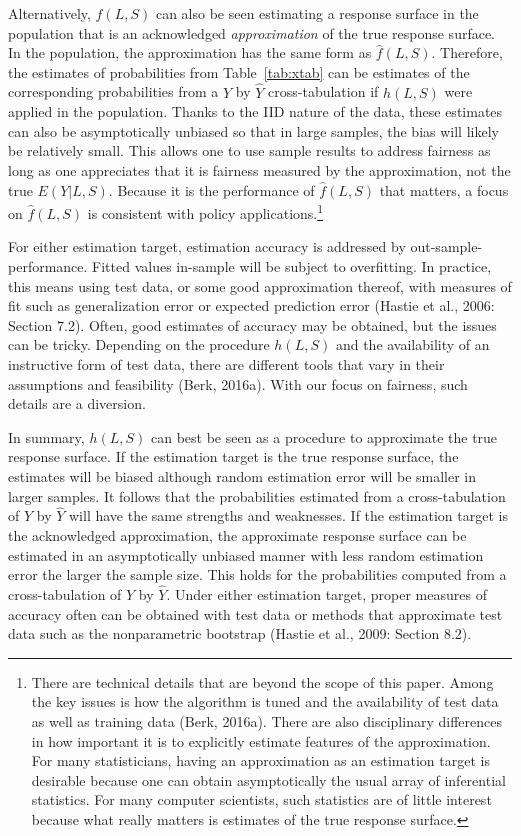 \documentclass[12pt]{article}
\begin{document}
Alternatively, $\hat{f}(L,S)$ can also be seen estimating a response surface in the population that is an acknowledged \textit{approximation} of the true response surface. In the population, the approximation has the same form as $\hat{f}(L,S)$. Therefore, the estimates of probabilities from Table~\ref{tab:xtab} can be estimates of the corresponding probabilities from a $Y$ by $\hat{Y}$ cross-tabulation if $h(L,S)$ were applied in the population. Thanks to the IID nature of the data, these estimates can also be asymptotically unbiased so that in large samples, the bias will likely be relatively small. This allows one to use sample results to address fairness as long as one appreciates that it is fairness measured by the approximation, not the true $E(Y|L,S)$. Because it is the performance of $\hat{f}(L,S)$ that matters, a focus on $\hat{f}(L,S)$ is consistent with policy applications.\footnote
{
There are technical details that are beyond the scope of this paper. Among the key issues is how the algorithm is tuned and the availability of test data as well as training data (Berk, 2016a). There are also disciplinary differences in how important it is to explicitly estimate features of the approximation. For many statisticians, having an approximation as an estimation target is desirable because one can obtain asymptotically the usual array of inferential statistics. For many computer scientists, such statistics are of little interest because what really matters is estimates of the true response surface.
}

For either estimation target, estimation accuracy is addressed by out-sample-performance. Fitted values in-sample will be subject to overfitting. In practice, this means using test data, or some good approximation thereof, with measures of fit such as generalization error or expected prediction error (Hastie et al., 2006: Section 7.2). Often, good estimates of accuracy may be obtained, but the issues can be tricky. Depending on the procedure $h(L,S)$ and the availability of an instructive form of test data, there are different tools that vary in their assumptions and feasibility (Berk, 2016a). With our focus on fairness, such details are a diversion. 

In summary, $h(L,S)$ can best be seen as a procedure to approximate the true response surface. If the estimation target is the true response surface, the estimates will be biased although random estimation error will be smaller in larger samples. It follows that the probabilities estimated from a cross-tabulation of $Y$ by $\hat{Y}$ will have the same strengths and weaknesses. If the estimation target is the acknowledged approximation, the approximate response surface can be estimated in an asymptotically unbiased manner with less random estimation error the larger the sample size. This holds for the probabilities computed from a cross-tabulation of $Y$ by $\hat{Y}$. Under either estimation target, proper measures of accuracy often can be obtained with test data or methods that approximate test data such as the nonparametric bootstrap (Hastie et al., 2009: Section 8.2).
\end{document}
